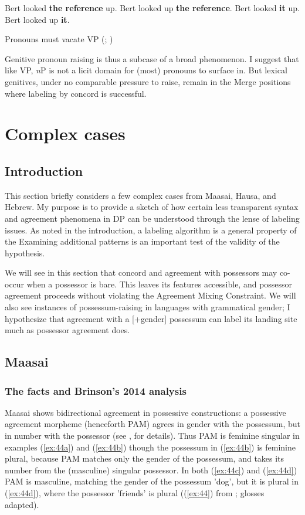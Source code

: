 \documentclass[output=paper
,modfonts
,nonflat]{langsci/langscibook}
\begin{document}
\begin{exe}
\ex\label{ex:42} \xlist
\ex Bert looked \textbf{the reference} up.
\ex Bert looked up \textbf{the reference}.
\ex Bert looked \textbf{it} up.
\ex *Bert looked up \textbf{it}.
\endxlist
\end{exe}
\begin{exe} 
\ex Pronouns must vacate VP (\citealt{Diesing1992, Diesing1997}; \citealt{Diesing_Jelinek1995})
\end{exe}
Genitive pronoun raising is thus a subcase of a broad phenomenon. I suggest that like VP, \textit{n}P is not a licit domain for (most) pronouns to surface in. But lexical genitives, under no comparable pressure to raise, remain in the Merge positions where labeling by concord is successful. 

\section{Complex cases} \label{sec:6}
\subsection{Introduction} \label{sec:6.1}

This section briefly considers a few complex cases from Maasai, Hausa, and Hebrew. My purpose is to provide a sketch of how certain less transparent syntax and agreement phenomena in DP can be understood through the lense of labeling issues. As noted in the introduction, a labeling algorithm is a general property of the Examining additional patterns is an important test of the validity of the hypothesis.

We will see in this section that concord and agreement with possessors may co-occur when a possessor is bare. This leaves its features accessible, and possessor agreement proceeds without violating the Agreement Mixing Constraint. We will also see instances of possessum-raising in languages with grammatical gender; I hypothesize that agreement with a [+gender] possessum can label its landing site much as possessor agreement does.

\subsection{Maasai} \label{sec:6.2}
\subsubsection{The facts and Brinson's 2014 analysis} \label{sec:6.2.1}
Maasai shows bidirectional agreement in possessive constructions: a possessive agreement morpheme (henceforth PAM) agrees in gender with the possessum, but in number with the possessor (see \citealt{Storto2003}, \citealt{Brinson2014} for details). Thus PAM is feminine singular in examples (\ref{ex:44a}) and (\ref{ex:44b}) though the possessum in (\ref{ex:44b}) is feminine plural, because PAM matches only the gender of the possessum, and takes its number from the (masculine) singular possessor. In both (\ref{ex:44c}) and (\ref{ex:44d}) PAM  is masculine, matching the gender of the possessum 'dog', but it is plural in (\ref{ex:44d}), where the possessor 'friends' is plural ((\ref{ex:44}) from \citealt{Brinson2014}; glosses adapted).
\end{document}
